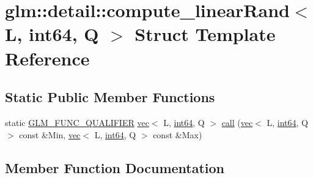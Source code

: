 \hypertarget{structglm_1_1detail_1_1compute__linear_rand_3_01_l_00_01int64_00_01_q_01_4}{}\section{glm\+:\+:detail\+:\+:compute\+\_\+linear\+Rand$<$ L, int64, Q $>$ Struct Template Reference}
\label{structglm_1_1detail_1_1compute__linear_rand_3_01_l_00_01int64_00_01_q_01_4}
\subsection*{Static Public Member Functions}
\begin{DoxyCompactItemize}
\item 
static \hyperlink{setup_8hpp_a33fdea6f91c5f834105f7415e2a64407}{G\+L\+M\+\_\+\+F\+U\+N\+C\+\_\+\+Q\+U\+A\+L\+I\+F\+I\+ER} \hyperlink{structglm_1_1vec}{vec}$<$ L, \hyperlink{namespaceglm_1_1detail_a5b1c3227ec636c24a0676746381adfc8}{int64}, Q $>$ \hyperlink{structglm_1_1detail_1_1compute__linear_rand_3_01_l_00_01int64_00_01_q_01_4_a228cd2fef53b8af89955bc01dfde047a}{call} (\hyperlink{structglm_1_1vec}{vec}$<$ L, \hyperlink{namespaceglm_1_1detail_a5b1c3227ec636c24a0676746381adfc8}{int64}, Q $>$ const \&Min, \hyperlink{structglm_1_1vec}{vec}$<$ L, \hyperlink{namespaceglm_1_1detail_a5b1c3227ec636c24a0676746381adfc8}{int64}, Q $>$ const \&Max)
\end{DoxyCompactItemize}


\subsection{Member Function Documentation}
\mbox{\label{structglm_1_1detail_1_1compute__linear_rand_3_01_l_00_01int64_00_01_q_01_4_a228cd2fef53b8af89955bc01dfde047a}} 
